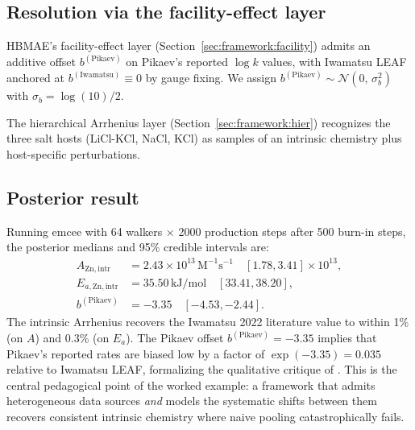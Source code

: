 \documentclass[12pt]{article}
\theoremstyle{plain}
\theoremstyle{definition}
\theoremstyle{remark}
\newcommand{\HBMAE}{HBMAE\xspace}
\begin{document}
\subsection{Resolution via the facility-effect layer}

\HBMAE's facility-effect layer (Section~\ref{sec:framework:facility})
admits an additive offset $b^{(\mathrm{Pikaev})}$ on Pikaev's reported
$\log k$ values, with Iwamatsu LEAF anchored at
$b^{(\mathrm{Iwamatsu})}\equiv 0$ by gauge fixing.  We assign
$b^{(\mathrm{Pikaev})} \sim \mathcal{N}(0,\,\sigma_b^2)$ with
$\sigma_b = \log(10)/2$.

The hierarchical Arrhenius layer (Section~\ref{sec:framework:hier})
recognizes the three salt hosts (LiCl-KCl, NaCl, KCl) as samples of an
intrinsic chemistry plus host-specific perturbations.

\subsection{Posterior result}\label{sec:worked2:result}

Running emcee with 64 walkers $\times$ 2000 production steps after 500
burn-in steps, the posterior medians and 95\% credible intervals are:
%
\begin{align*}
  A_{\mathrm{Zn,intr}} &= 2.43\times 10^{13}\,\mathrm{M}^{-1}\mathrm{s}^{-1}
    \quad [1.78, 3.41]\times 10^{13}, \\
  E_{a,\mathrm{Zn,intr}} &= 35.50\,\mathrm{kJ/mol}\quad [33.41, 38.20], \\
  b^{(\mathrm{Pikaev})} &= -3.35\quad [-4.53, -2.44].
\end{align*}
%
The intrinsic Arrhenius recovers the Iwamatsu 2022 literature value to
within 1\% (on $A$) and 0.3\% (on $E_a$).  The Pikaev offset
$b^{(\mathrm{Pikaev})} = -3.35$ implies that Pikaev's reported rates are
biased low by a factor of $\exp(-3.35) = 0.035$ relative to Iwamatsu LEAF,
formalizing the qualitative critique of \citet{Iwamatsu2022}.  This is the
central pedagogical point of the worked example:  a framework that admits
heterogeneous data sources \emph{and} models the systematic shifts between
them recovers consistent intrinsic chemistry where naive pooling
catastrophically fails.

\end{document}
